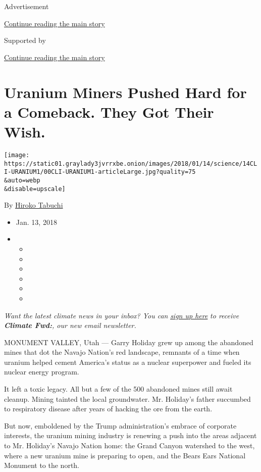 Advertisement

\protect\hyperlink{after-top}{Continue reading the main story}

Supported by

\protect\hyperlink{after-sponsor}{Continue reading the main story}

\hypertarget{uranium-miners-pushed-hard-for-a-comeback-they-got-their-wish}{%
\section{Uranium Miners Pushed Hard for a Comeback. They Got Their
Wish.}\label{uranium-miners-pushed-hard-for-a-comeback-they-got-their-wish}}

\texttt{[image: https://static01.graylady3jvrrxbe.onion/images/2018/01/14/science/14CLI-URANIUM1/00CLI-URANIUM1-articleLarge.jpg?quality=75\\\&auto=webp\\\&disable=upscale]}

By \href{http://www.nytimes3xbfgragh.onion/by/hiroko-tabuchi}{Hiroko
Tabuchi}

\begin{itemize}
\item
  Jan. 13, 2018
\item
  \begin{itemize}
  \item
  \item
  \item
  \item
  \item
  \item
  \end{itemize}
\end{itemize}

\emph{Want the latest climate news in your inbox? You can}
\href{https://www.nytimes3xbfgragh.onion/newsletters/climate-change}{\emph{sign
up here}} \emph{to receive} \emph{\textbf{Climate Fwd:}}\emph{, our new
email newsletter.}

MONUMENT VALLEY, Utah --- Garry Holiday grew up among the abandoned
mines that dot the Navajo Nation's red landscape, remnants of a time
when uranium helped cement America's status as a nuclear superpower and
fueled its nuclear energy program.

It left a toxic legacy. All but a few of the 500 abandoned mines still
await cleanup. Mining tainted the local groundwater. Mr. Holiday's
father succumbed to respiratory disease after years of hacking the ore
from the earth.

But now, emboldened by the Trump administration's embrace of corporate
interests, the uranium mining industry is renewing a push into the areas
adjacent to Mr. Holiday's Navajo Nation home: the Grand Canyon watershed
to the west, where a new uranium mine is preparing to open, and the
Bears Ears National Monument to the north.

